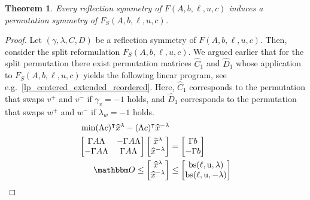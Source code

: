 \documentclass[pdflatex,sn-mathphys-num]{sn-jnl}%
\theoremstyle{thmstyleone}%
\newtheorem{theorem}[theorem]{Theorem}
\theoremstyle{thmstylethree}%
\theoremstyle{thmstyletwo}%
\begin{document}
\begin{theorem}
    \label{thm_reflection_symmetry_permutation_symmetry}
    Every reflection symmetry of $F(A,b,\ell,u,c)$ induces a permutation symmetry of $F_S(A,b,\ell,u,c)$.
\end{theorem}
\begin{proof}
    Let $(\gamma,\lambda,C,D)$ be a reflection symmetry of $F(A,b,\ell,u,c)$. Then, consider the split reformulation $F_S(A,b,\ell,u,c)$. 
    We argued earlier that for the split permutation there exist permutation matrices $\widehat{C}_1$ and $\widehat{D}_1$ whose application to $F_S(A,b,\ell,u,c)$ yields the following linear program, see e.g.~\eqref{lp_centered_extended_reordered}. Here, $\widehat{C}_1$ corresponds to the permutation that swaps $v^+$ and $v^-$ if $\gamma_v = -1$ holds, and $\widehat{D}_1$ corresponds to the permutation that swaps $w^+$ and $w^-$ if $\lambda_w = -1$ holds.
    \begin{subequations}
    \label{eq_reflection_symmetry_reordered}
    \begin{align}
        \min \transpose{(\Lambda c)} \widehat{x}^\lambda - \transpose{(\Lambda c)} \widehat{x}^{-\lambda}&\\
        \begin{bmatrix}
            \Gamma A \Lambda & - \Gamma A \Lambda\\
            -\Gamma A \Lambda & \Gamma A \Lambda
        \end{bmatrix} \begin{bmatrix}
            \widehat{x}^\lambda\\
            \widehat{x}^{-\lambda}
        \end{bmatrix} &= \begin{bmatrix}
            \Gamma b\\
            - \Gamma b
        \end{bmatrix}\\
        \zerovec \leq \begin{bmatrix}
            \widehat{x}^\lambda\\
            \widehat{x}^{-\lambda}
        \end{bmatrix} & \leq \begin{bmatrix}
            \mathrm{bs(\ell,u,\lambda)}\\
            \mathrm{bs(\ell,u,-\lambda)}
        \end{bmatrix} 
    \end{align}
    \end{subequations}

\end{proof}
\end{document}
